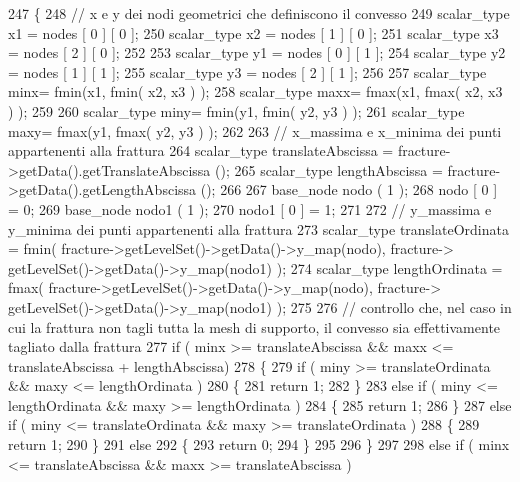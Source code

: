 \begin{DoxyCode}
247 \{
248     \textcolor{comment}{// x e y dei nodi geometrici che definiscono il convesso}
249     scalar\_type x1 = nodes [ 0 ] [ 0 ];
250     scalar\_type x2 = nodes [ 1 ] [ 0 ];
251     scalar\_type x3 = nodes [ 2 ] [ 0 ];
252 
253     scalar\_type y1 = nodes [ 0 ] [ 1 ];
254     scalar\_type y2 = nodes [ 1 ] [ 1 ];
255     scalar\_type y3 = nodes [ 2 ] [ 1 ];
256 
257     scalar\_type minx= fmin(x1, fmin( x2, x3 ) );
258     scalar\_type maxx= fmax(x1, fmax( x2, x3 ) );
259 
260     scalar\_type miny= fmin(y1, fmin( y2, y3 ) );
261     scalar\_type maxy= fmax(y1, fmax( y2, y3 ) );
262 
263     \textcolor{comment}{// x\_massima e x\_minima dei punti appartenenti alla frattura}
264     scalar\_type translateAbscissa = fracture->getData().getTranslateAbscissa ();
265     scalar\_type lengthAbscissa = fracture->getData().getLengthAbscissa ();
266 
267     base\_node nodo ( 1 );
268     nodo [ 0 ] = 0;
269     base\_node nodo1 ( 1 );
270     nodo1 [ 0 ] = 1;
271     
272     \textcolor{comment}{// y\_massima e y\_minima dei punti appartenenti alla frattura}
273     scalar\_type translateOrdinata = fmin( fracture->getLevelSet()->getData()->y\_map(nodo), fracture->
      getLevelSet()->getData()->y\_map(nodo1) );
274     scalar\_type lengthOrdinata = fmax( fracture->getLevelSet()->getData()->y\_map(nodo), fracture->
      getLevelSet()->getData()->y\_map(nodo1) );
275     
276     \textcolor{comment}{// controllo che, nel caso in cui la frattura non tagli tutta la mesh di supporto, il convesso sia
       effettivamente tagliato dalla frattura}
277     \textcolor{keywordflow}{if} ( minx >= translateAbscissa && maxx <= translateAbscissa + lengthAbscissa)
278     \{   
279         \textcolor{keywordflow}{if} ( miny >= translateOrdinata && maxy <= lengthOrdinata )
280         \{   
281             \textcolor{keywordflow}{return} 1;
282         \}
283         \textcolor{keywordflow}{else} \textcolor{keywordflow}{if} ( miny <= lengthOrdinata && maxy >= lengthOrdinata )
284         \{   
285             \textcolor{keywordflow}{return} 1;
286         \}
287         \textcolor{keywordflow}{else} \textcolor{keywordflow}{if} ( miny <= translateOrdinata && maxy >= translateOrdinata )
288         \{   
289             \textcolor{keywordflow}{return} 1;
290         \}
291         \textcolor{keywordflow}{else}
292         \{   
293             \textcolor{keywordflow}{return} 0;
294         \}
295 
296     \}
297 
298     \textcolor{keywordflow}{else} \textcolor{keywordflow}{if} ( minx <= translateAbscissa && maxx >= translateAbscissa )

\end{DoxyCode}

